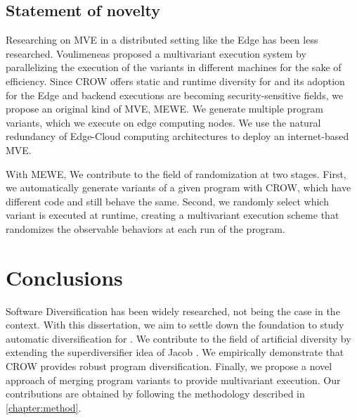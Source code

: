 \subsection*{Statement of novelty}
\label{sota:contribs}


Researching on MVE in a distributed setting like the Edge \citationneeded has been less researched. Voulimeneas \etal proposed a multivariant execution system by parallelizing the execution of the variants in different machines \cite{voulimeneas2021dmvx} for the sake of efficiency. Since CROW offers static and runtime diversity for \wasm and its adoption for the Edge and backend executions are becoming security-sensitive fields, we propose an original kind of MVE, MEWE. We generate multiple program variants, which we execute on edge computing nodes. We use the natural redundancy of Edge-Cloud computing architectures to deploy an internet-based MVE.

With MEWE, We contribute to the field of randomization at two stages. First, we automatically generate variants of a given program with CROW, which have different \wasm code and still behave the same. Second, we randomly select which variant is executed at runtime, creating a multivariant execution scheme that randomizes the observable behaviors at each run of the program.



\section{Conclusions}
\label{sota:conclusions}

Software Diversification has been widely researched, not being the case in the \wasm context. With this dissertation, we aim to settle down the foundation to study automatic diversification for \wasm. We contribute to the field of artificial diversity by extending the superdiversifier idea of Jacob \etal \cite{jacob2008superdiversifier}. We empirically demonstrate that CROW provides robust program diversification. Finally, we propose a novel approach of merging program variants to provide multivariant execution. Our
contributions are obtained by following the methodology described in \autoref{chapter:method}. 


